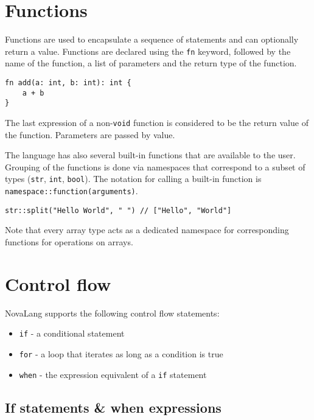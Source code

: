 \documentclass[conference]{IEEEtran}
\begin{document}
\section{Functions} \label{sec:functions}

Functions are used to encapsulate a sequence of statements and can optionally return a value.
Functions are declared using the \texttt{fn} keyword, followed by the name of the function, a list of parameters and the return type of the function.

\begin{lstlisting}
fn add(a: int, b: int): int {
    a + b
}
\end{lstlisting}

The last expression of a non-\texttt{void} function is considered to be the return value of the function.
Parameters are passed by value.

The language has also several built-in functions that are available to the user.
Grouping of the functions is done via namespaces that correspond to a subset of types (\texttt{str}, \texttt{int}, \texttt{bool}).
The notation for calling a built-in function is \texttt{namespace::function(arguments)}.

\begin{lstlisting}
str::split("Hello World", " ") // ["Hello", "World"]
\end{lstlisting}

Note that every array type acts as a dedicated namespace for corresponding functions for operations on arrays.

\section{Control flow} \label{sec:control-flow}

NovaLang supports the following control flow statements:
\begin{itemize}
    \item \texttt{if} - a conditional statement
    \item \texttt{for} - a loop that iterates as long as a condition is true
    \item \texttt{when} - the expression equivalent of a \texttt{if} statement
\end{itemize}

\subsection{If statements \& when expressions}
\end{document}
